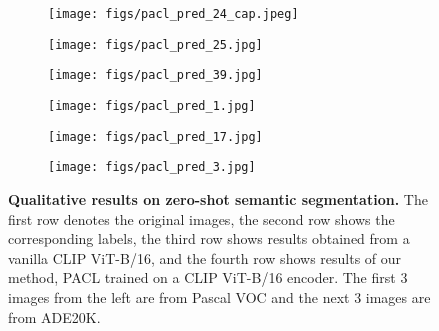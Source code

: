 \documentclass[10pt,twocolumn,letterpaper]{article}
\begin{document}
\begin{figure}[!t]
    \begin{subfigure}{0.17\linewidth}
        \centering
        \texttt{[image: figs/pacl\_pred\_24\_cap.jpeg]}
        \vspace{-5mm}
    \end{subfigure}
    \begin{subfigure}{0.132\linewidth}
        \centering
        \texttt{[image: figs/pacl\_pred\_25.jpg]}
        \vspace{-5mm}
    \end{subfigure}
    \begin{subfigure}{0.142\linewidth}
        \centering
        \texttt{[image: figs/pacl\_pred\_39.jpg]}
        \vspace{-5mm}
    \end{subfigure}
    \begin{subfigure}{0.142\linewidth}
        \centering
        \texttt{[image: figs/pacl\_pred\_1.jpg]}
        \vspace{-5mm}
    \end{subfigure}
    \begin{subfigure}{0.136\linewidth}
        \centering
        \texttt{[image: figs/pacl\_pred\_17.jpg]}
        \vspace{-5mm}
    \end{subfigure}
    \begin{subfigure}{0.135\linewidth}
        \centering
        \texttt{[image: figs/pacl\_pred\_3.jpg]}
        \vspace{-5mm}
    \end{subfigure}

    \caption{\textbf{Qualitative results on zero-shot semantic segmentation.} The first row denotes the original images, the second row shows the corresponding labels, the third row shows results obtained from a vanilla CLIP ViT-B/16, and the fourth row shows results of our method, PACL trained on a CLIP ViT-B/16 encoder. The first 3 images from the left are from Pascal VOC and the next 3 images are from ADE20K.}
    \vspace{-4mm}
    \label{fig:zeroshot_segmentation_qualitative}
\end{figure}
\end{document}
